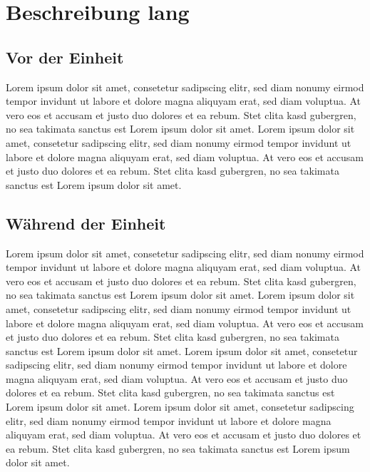 \documentclass[a4paper,11pt]{scrartcl} %
\begin{document}
 
\section{Beschreibung lang} 

  \subsection{Vor der Einheit} %
Lorem ipsum dolor sit amet, consetetur sadipscing elitr, sed diam nonumy 
eirmod tempor invidunt ut labore et dolore magna aliquyam erat, sed diam 
voluptua. At vero eos et accusam et justo duo dolores et ea rebum. Stet 
clita kasd gubergren, no sea takimata sanctus est Lorem ipsum dolor sit 
amet. Lorem ipsum dolor sit amet, consetetur sadipscing elitr, sed diam 
nonumy eirmod tempor invidunt ut labore et dolore magna aliquyam erat, 
sed diam voluptua. At vero eos et accusam et justo duo dolores et ea rebum. 
Stet clita kasd gubergren, no sea takimata sanctus est Lorem ipsum dolor sit 
amet.

  \subsection{Während der Einheit} %
Lorem ipsum dolor sit amet, consetetur sadipscing elitr, sed diam nonumy 
eirmod tempor invidunt ut labore et dolore magna aliquyam erat, sed diam 
voluptua. At vero eos et accusam et justo duo dolores et ea rebum. Stet 
clita kasd gubergren, no sea takimata sanctus est Lorem ipsum dolor sit 
amet. Lorem ipsum dolor sit amet, consetetur sadipscing elitr, sed diam 
nonumy eirmod tempor invidunt ut labore et dolore magna aliquyam erat, 
sed diam voluptua. At vero eos et accusam et justo duo dolores et ea rebum. 
Stet clita kasd gubergren, no sea takimata sanctus est Lorem ipsum dolor sit 
amet.
Lorem ipsum dolor sit amet, consetetur sadipscing elitr, sed diam nonumy 
eirmod tempor invidunt ut labore et dolore magna aliquyam erat, sed diam 
voluptua. At vero eos et accusam et justo duo dolores et ea rebum. Stet 
clita kasd gubergren, no sea takimata sanctus est Lorem ipsum dolor sit 
amet. Lorem ipsum dolor sit amet, consetetur sadipscing elitr, sed diam 
nonumy eirmod tempor invidunt ut labore et dolore magna aliquyam erat, 
sed diam voluptua. At vero eos et accusam et justo duo dolores et ea rebum. 
Stet clita kasd gubergren, no sea takimata sanctus est Lorem ipsum dolor sit 
amet.
\end{document}
